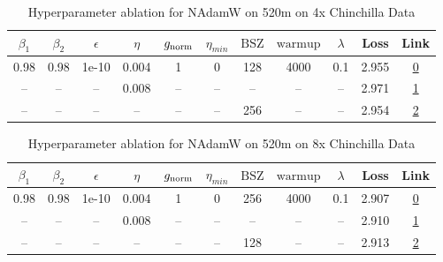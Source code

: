 \begin{table}[H]
\centering
\caption{Hyperparameter ablation for NAdamW on 520m on 4x Chinchilla Data}
\label{tab:ablation_nadamw_520m_on_4x_chinchilla_data}
\begin{tabular}{ccccccccccc}
\toprule
$\beta_1$ & $\beta_2$ & $\epsilon$ & $\eta$ & $g_{\mathrm{norm}}$ & $\eta_{min}$ & $\mathrm{BSZ}$ & $\mathrm{warmup}$ & $\lambda$ & Loss & Link \\
\midrule
0.98 & 0.98 & 1e-10 & 0.004 & 1 & 0 & 128 & 4000 & 0.1 & 2.955 & \href{https://wandb.ai/marin-community/optimizer-scaling/runs/sweep-520m-42B-nadamwcf9d95lr0.004-wd0.1-minlr0-warmup4000-b10.9-40428f}{0} \\
\midrule
-- & -- & -- & 0.008 & -- & -- & -- & -- & -- & 2.971 & \href{https://wandb.ai/marin-community/optimizer-scaling/runs/sweep-520m-42B-nadamwbd85falr0.008-wd0.1-minlr0-warmup4000-b10.9-2ceead}{1} \\
-- & -- & -- & -- & -- & -- & 256 & -- & -- & 2.954 & \href{https://wandb.ai/marin-community/optimizer-scaling/runs/sweep-520m-42B-nadamw0a1fe6lr0.004-wd0.1-minlr0-warmup4000-b10.9-2395f8}{2} \\
\bottomrule
\end{tabular}
\end{table}

\begin{table}[H]
\centering
\caption{Hyperparameter ablation for NAdamW on 520m on 8x Chinchilla Data}
\label{tab:ablation_nadamw_520m_on_8x_chinchilla_data}
\begin{tabular}{ccccccccccc}
\toprule
$\beta_1$ & $\beta_2$ & $\epsilon$ & $\eta$ & $g_{\mathrm{norm}}$ & $\eta_{min}$ & $\mathrm{BSZ}$ & $\mathrm{warmup}$ & $\lambda$ & Loss & Link \\
\midrule
0.98 & 0.98 & 1e-10 & 0.004 & 1 & 0 & 256 & 4000 & 0.1 & 2.907 & \href{https://wandb.ai/marin-community/optimizer-scaling/runs/sweep-520m-85B-nadamwcf9d95lr0.004-wd0.1-minlr0-warmup4000-b10.9-d09912}{0} \\
\midrule
-- & -- & -- & 0.008 & -- & -- & -- & -- & -- & 2.910 & \href{https://wandb.ai/marin-community/optimizer-scaling/runs/sweep-520m-85B-nadamwpbd85falr0.008-wd0.1-minlr0-warmup4000-b10.-9c80f6}{1} \\
-- & -- & -- & -- & -- & -- & 128 & -- & -- & 2.913 & \href{https://wandb.ai/marin-community/optimizer-scaling/runs/sweep-520m-85B-nadamwpe2b0f0lr0.004-wd0.1-minlr0-warmup4000-b10.-262c7c}{2} \\
\bottomrule
\end{tabular}
\end{table}

